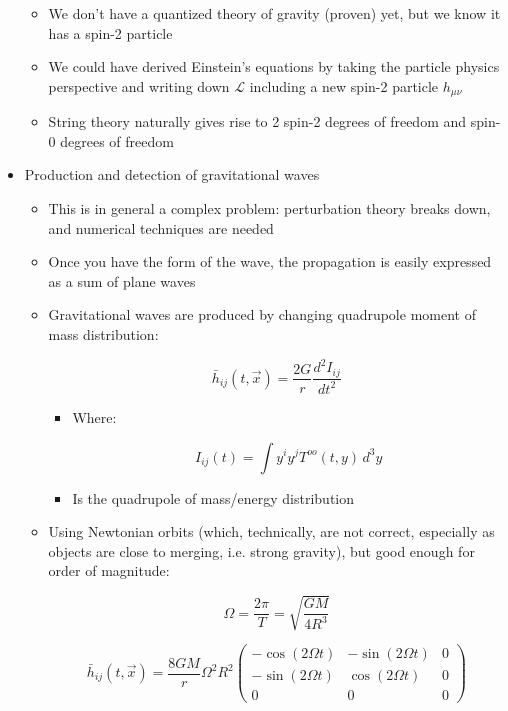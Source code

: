 \begin{itemize}
\begin{itemize}
      \item We don't have a quantized theory of gravity (proven) yet, but we know it has a spin-2 particle

      \item We could have derived Einstein's equations by taking the particle physics perspective and writing down $\mathcal{L}$ including a new spin-2 particle $h_{\mu\nu}$

      \item String theory naturally gives rise to 2 spin-2 degrees of freedom and spin-0 degrees of freedom

    \end{itemize}

  \item Production and detection of gravitational waves

    \begin{itemize}

      \item This is in general a complex problem: perturbation theory breaks down, and numerical techniques are needed

      \item Once you have the form of the wave, the propagation is easily expressed as a sum of plane waves

      \item Gravitational waves are produced by changing quadrupole moment of mass distribution:

        $$\bar{h}_{ij}(t,\vec{x})=\frac{2G}{r}\frac{d^2I_{ij}}{dt^2}$$

        \begin{itemize}

          \item Where:

            $$I_{ij}(t)=\int y^iy^jT^{oo}(t,y)\,d^3y$$

          \item Is the quadrupole of mass/energy distribution

        \end{itemize}

      \item Using Newtonian orbits (which, technically, are not correct, especially as objects are close to merging, i.e. strong gravity), but good enough for order of magnitude:

        $$\Omega=\frac{2\pi}{T}=\sqrt{\frac{GM}{4R^3}}$$

        $$\bar{h}_{ij}(t,\vec{x})=\frac{8GM}{r}\Omega^2R^2\left( \begin{matrix} -\cos(2\Omega t) & -\sin(2\Omega t) & 0\\ -\sin(2\Omega t) & \cos(2\Omega t) & 0\\ 0 & 0 & 0 \end{matrix} \right)$$


\end{itemize}
\end{itemize}
